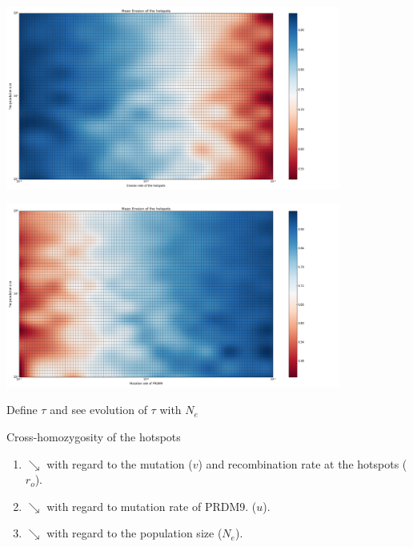 \documentclass[10pt]{beamer}
\begin{document}
\begin{frame}
	\begin{center}
       \includegraphics[width=11cm]{Images/mean-erosion-population-erosion.png}
	\end{center}
\end{frame}

\begin{frame}
	\begin{center}
       \includegraphics[width=11cm]{Images/mean-erosion-population-mutation.png}
	\end{center}
\end{frame}

\begin{frame}
	\begin{center}
	\Large
    Define $\tau$ and see evolution of $\tau$ with $N_e$
	\end{center}
\end{frame}

\begin{frame}
	\begin{center}
		\Large
    	Cross-homozygosity of the hotspots
	\end{center}
	\begin{enumerate}
		\item $\searrow$ with regard to the mutation ($v$) and recombination rate at the hotspots ($r_o$).
		
		\item $\searrow$ with regard to mutation rate of PRDM9. ($u$).
		
		\item $\searrow$ with regard to the population size ($N_e$).
		
	\end{enumerate}
\end{frame}
\end{document}
